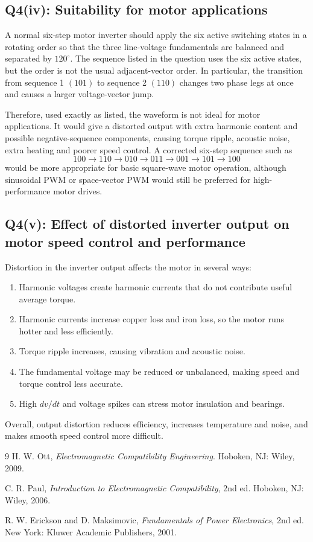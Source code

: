 \documentclass[11pt,a4paper]{article}
\begin{document}
\subsection*{Q4(iv): Suitability for motor applications}

A normal six-step motor inverter should apply the six active switching states in a rotating order so that the three line-voltage fundamentals are balanced and separated by $120^\circ$. The sequence listed in the question uses the six active states, but the order is not the usual adjacent-vector order. In particular, the transition from sequence 1 $(101)$ to sequence 2 $(110)$ changes two phase legs at once and causes a larger voltage-vector jump.

Therefore, used exactly as listed, the waveform is not ideal for motor applications. It would give a distorted output with extra harmonic content and possible negative-sequence components, causing torque ripple, acoustic noise, extra heating and poorer speed control. A corrected six-step sequence such as
\[
100\to 110\to 010\to 011\to 001\to 101\to 100
\]
would be more appropriate for basic square-wave motor operation, although sinusoidal PWM or space-vector PWM would still be preferred for high-performance motor drives.

\subsection*{Q4(v): Effect of distorted inverter output on motor speed control and performance}

Distortion in the inverter output affects the motor in several ways:
\begin{enumerate}
\item Harmonic voltages create harmonic currents that do not contribute useful average torque.
\item Harmonic currents increase copper loss and iron loss, so the motor runs hotter and less efficiently.
\item Torque ripple increases, causing vibration and acoustic noise.
\item The fundamental voltage may be reduced or unbalanced, making speed and torque control less accurate.
\item High $dv/dt$ and voltage spikes can stress motor insulation and bearings.
\end{enumerate}
Overall, output distortion reduces efficiency, increases temperature and noise, and makes smooth speed control more difficult.

\begin{thebibliography}{9}
H. W. Ott, \emph{Electromagnetic Compatibility Engineering}. Hoboken, NJ: Wiley, 2009.

C. R. Paul, \emph{Introduction to Electromagnetic Compatibility}, 2nd ed. Hoboken, NJ: Wiley, 2006.

R. W. Erickson and D. Maksimovic, \emph{Fundamentals of Power Electronics}, 2nd ed. New York: Kluwer Academic Publishers, 2001.
\end{thebibliography}
\end{document}
